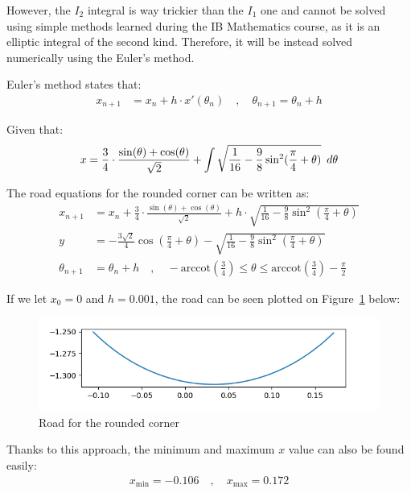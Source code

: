 \documentclass[12pt]{article}
\newcommand{\Hquad}{\hspace{0.5em}}
\begin{document}
        However, the $I_2$ integral is way trickier than the $I_1$ one and cannot be solved using simple methods learned during the IB Mathematics course, as it is an elliptic integral of the second kind\cite{elliptic_integral}. Therefore, it will be instead solved numerically using the Euler's method. 

        Euler's method states that:
        \begin{align}
            x_{n+1} &= x_n + h \cdot x'(\theta_n) \quad , \quad
            \theta_{n+1} = \theta_n +h
        \end{align}
 
        Given that:
        \begin{equation}
            x = \frac{3}{4} \cdot \frac{\sin(\theta) + \cos(\theta)}{\sqrt{2}} + \int \sqrt{\frac{1}{16} - \frac{9}{8} \sin^2 (\frac{\pi}{4}+\theta)} \Hquad d\theta
        \end{equation}

        The road equations for the rounded corner can be written as:
        \begin{align}
            x_{n+1} &= x_n + \frac{3}{4} \cdot \frac{\sin(\theta) + \cos(\theta)}{\sqrt{2}} +
            h \cdot \sqrt{\frac{1}{16} - \frac{9}{8} \sin^2 (\frac{\pi}{4}+\theta)} \\
            y &= - \frac{3\sqrt{2}}{4} \cos (\frac{\pi}{4} + \theta) - \sqrt{\frac{1}{16} - \frac{9}{8} \sin^2 (\frac{\pi}{4}+\theta)} \\
            \theta_{n+1} &= \theta_n +h \quad , \quad - \text{arccot}(\frac{3}{4}) \leq \theta \leq \text{arccot}(\frac{3}{4}) - \frac{\pi}{2}
        \end{align}

        If we let $x_0 = 0$ and $h=0.001$, the road can be seen plotted on Figure~\ref{fig:corner_road} below:
        \begin{figure}[H]
            \includegraphics[width=\linewidth]{images/corner_road.png}
            \caption{Road for the rounded corner}\label{fig:corner_road}
        \end{figure}

        Thanks to this approach, the minimum and maximum $x$ value can also be found easily:
        \begin{align*}
            x_{\text{min}} = -0.106 \quad , \quad x_{\text{max}} = 0.172
        \end{align*}
\end{document}
